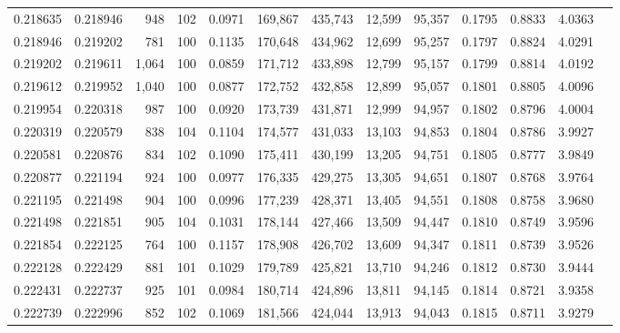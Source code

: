\begin{tabular}{rrrrrrrrrrrrr}
0.218635 & 0.218946 &   948 & 102 &                                     0.0971 & 169,867 & 435,743 &  12,599 &  95,357 & 0.1795 & 0.8833 & 4.0363 \\
0.218946 & 0.219202 &   781 & 100 &                                     0.1135 & 170,648 & 434,962 &  12,699 &  95,257 & 0.1797 & 0.8824 & 4.0291 \\
0.219202 & 0.219611 & 1,064 & 100 &                                     0.0859 & 171,712 & 433,898 &  12,799 &  95,157 & 0.1799 & 0.8814 & 4.0192 \\
0.219612 & 0.219952 & 1,040 & 100 &                                     0.0877 & 172,752 & 432,858 &  12,899 &  95,057 & 0.1801 & 0.8805 & 4.0096 \\
0.219954 & 0.220318 &   987 & 100 &                                     0.0920 & 173,739 & 431,871 &  12,999 &  94,957 & 0.1802 & 0.8796 & 4.0004 \\
0.220319 & 0.220579 &   838 & 104 &                                     0.1104 & 174,577 & 431,033 &  13,103 &  94,853 & 0.1804 & 0.8786 & 3.9927 \\
0.220581 & 0.220876 &   834 & 102 &                                     0.1090 & 175,411 & 430,199 &  13,205 &  94,751 & 0.1805 & 0.8777 & 3.9849 \\
0.220877 & 0.221194 &   924 & 100 &                                     0.0977 & 176,335 & 429,275 &  13,305 &  94,651 & 0.1807 & 0.8768 & 3.9764 \\
0.221195 & 0.221498 &   904 & 100 &                                     0.0996 & 177,239 & 428,371 &  13,405 &  94,551 & 0.1808 & 0.8758 & 3.9680 \\
0.221498 & 0.221851 &   905 & 104 &                                     0.1031 & 178,144 & 427,466 &  13,509 &  94,447 & 0.1810 & 0.8749 & 3.9596 \\
0.221854 & 0.222125 &   764 & 100 &                                     0.1157 & 178,908 & 426,702 &  13,609 &  94,347 & 0.1811 & 0.8739 & 3.9526 \\
0.222128 & 0.222429 &   881 & 101 &                                     0.1029 & 179,789 & 425,821 &  13,710 &  94,246 & 0.1812 & 0.8730 & 3.9444 \\
0.222431 & 0.222737 &   925 & 101 &                                     0.0984 & 180,714 & 424,896 &  13,811 &  94,145 & 0.1814 & 0.8721 & 3.9358 \\
0.222739 & 0.222996 &   852 & 102 &                                     0.1069 & 181,566 & 424,044 &  13,913 &  94,043 & 0.1815 & 0.8711 & 3.9279 \\

\end{tabular}

